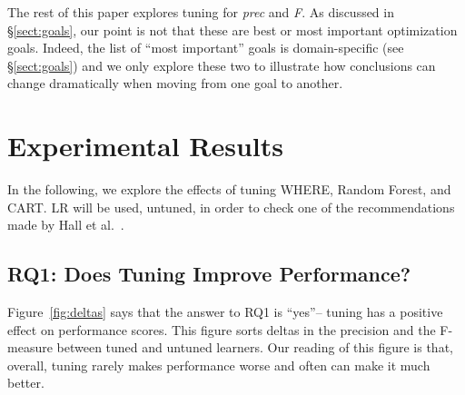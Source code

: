 \documentclass[final,twocolumn,5p]{elsarticle}
\newcommand{\tion}[1]{\S\ref{sect:#1}}
\newcommand{\fig}[1]{Figure~\ref{fig:#1}}
\begin{document}
The rest of this paper explores tuning for {\em prec} and {\em F}. As discussed
in \tion{goals}, our point is not that these are best or most important optimization goals.
Indeed, the list of ``most important'' goals is domain-specific (see \tion{goals})
and we only explore these two to illustrate how conclusions can change dramatically
when moving from one goal to another.




 

\section{Experimental Results}

In the following, we explore the effects of tuning WHERE, Random Forest,
and CART. LR will be used, untuned, in order to check one of the recommendations
made by Hall et al.~\cite{hall11}.

\subsection{RQ1:  Does  Tuning  Improve Performance? }\label{sect:precision}


\fig{deltas} says  that the answer to RQ1 is ``yes''-- tuning  has a positive effect on performance scores. This figure sorts
 deltas in the precision and the F-measure    between tuned and untuned learners. Our reading of this
figure is that, overall, tuning rarely makes performance   worse and often can make it much better. 
 
\end{document}
